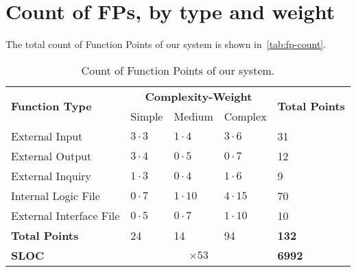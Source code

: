 \section{Count of FPs, by type and weight}

The total count of Function Points of our system is shown in~\autoref{tab:fp-count}.
\begin{table}[h]
    \centering
    \begin{tabular}{| l | l | l | l | l |}
        \hline
        \multirow{2}{*}{\textbf{Function Type}} & \multicolumn{3}{c|}{\textbf{Complexity-Weight}} & \multirow{2}{*}{\textbf{Total Points}} \\
        \cline{2-4}
        & Simple & Medium & Complex & \\
        \hline
        External Input          & $3 \cdot 3$     & $1 \cdot 4$     & $3 \cdot 6$     & 31     \\
        External Output         & $3 \cdot 4$     & $0 \cdot 5$     & $0 \cdot 7$     & 12     \\
        External Inquiry        & $1 \cdot 3$     & $0 \cdot 4$     & $1 \cdot 6$     & 9     \\
        Internal Logic File     & $0 \cdot 7$     & $1 \cdot 10$    & $4 \cdot 15$    & 70     \\
        External Interface File & $0 \cdot 5$     & $0 \cdot 7$     & $1 \cdot 10$    & 10     \\
        \hline
        \textbf{Total Points} & 24 & 14 & 94 & \textbf{132} \\
        \hline
        \textbf{SLOC} & \multicolumn{3}{|c|}{$\times 53$} & \textbf{6992}\\
        \hline
    \end{tabular}
    \caption{Count of Function Points of our system.}
    \label{tab:fp-count}
\end{table}
